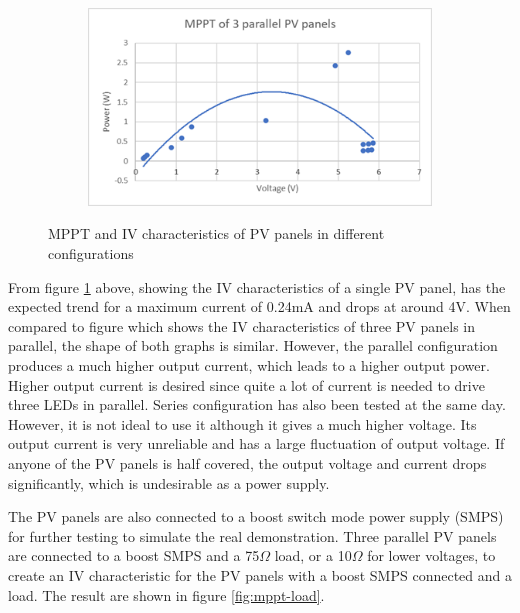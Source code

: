 \begin{figure}
\begin{subfigure}[b]{.45\linewidth}
    \end{subfigure}
    \begin{subfigure}[b]{.45\linewidth}
        \includegraphics[width=\linewidth]{images/mppt-3.png}
    \end{subfigure}
    \caption{MPPT and IV characteristics of PV panels in different configurations}
    \label{fig:mppt}
\end{figure}

From figure \ref{fig:mppt} above, showing the IV characteristics of a single PV panel, has the expected trend for a maximum current of 0.24mA and drops at around 4V. When compared to figure which shows the IV characteristics of three PV panels in parallel, the shape of both graphs is similar. However, the parallel configuration produces a much higher output current, which leads to a higher output power. Higher output current is desired since quite a lot of current is needed to drive three LEDs in parallel. Series configuration has also been tested at the same day. However, it is not ideal to use it although it gives a much higher voltage. Its output current is very unreliable and has a large fluctuation of output voltage. If anyone of the PV panels is half covered, the output voltage and current drops significantly, which is undesirable as a power supply.

The PV panels are also connected to a boost switch mode power supply (SMPS) for further testing to simulate the real demonstration. Three parallel PV panels are connected to a boost SMPS and a 75\(\Omega\) load, or a 10\(\Omega\) for lower voltages, to create an IV characteristic for the PV panels with a boost SMPS connected and a load. The result are shown in figure \ref{fig:mppt-load}.

